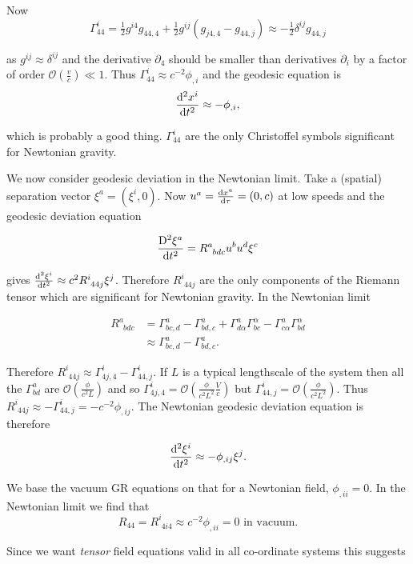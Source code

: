 \documentclass{notes}
\newcommand{\cO}{\mathcal{O}}
\begin{document}
Now
\[
\Gamma^i_{44} = \tfrac{1}{2} g^{i 4} g_{44,4} + \tfrac{1}{2} g^{ij}
(g_{j4,4} - g_{44,j}) \approx - \tfrac{1}{2} \delta^{ij} g_{44,j}
\]

as $g^{ij} \approx \delta^{ij}$ and the derivative $\partial_4$ should be
smaller than derivatives $\partial_i$ by a factor of order
$\cO(\tfrac{v}{c}) \ll 1$.  Thus $\Gamma^i_{44} \approx c^{-2} \phi_{,i}$
and the geodesic equation is
\[
\frac{\mathrm{d}^2 x^i}{\mathrm{d} t^2} \approx - \phi_{,i},
\]

which is probably a good thing.  $\Gamma^i_{44}$ are the only
Christoffel symbols significant for Newtonian gravity.

We now consider geodesic deviation in the Newtonian limit.  Take a
(spatial) separation vector $\xi^a = (\xi^i,0)$.  Now
$u^a = \frac{\mathrm{d} x^a}{\mathrm{d}\tau} = (0,c)$ at low speeds and the geodesic
deviation equation 

\[
\frac{\mathrm{D}^2 \xi^a}{\mathrm{d} t^2} = R^a_{\phantom{a}bdc}
u^b u^d \xi^c
\]

gives $\frac{\mathrm{d}^2 \xi^i}{\mathrm{d} t^2} \approx c^2 R^i_{\phantom{i}44j} \xi^j$.
Therefore $R^i_{\phantom{i}44j}$ are the only components of the Riemann
tensor which are significant for Newtonian gravity.  In the
Newtonian limit

\begin{align*}
R^a_{\phantom{a}bdc} &= \Gamma^a_{bc,d}
- \Gamma^a_{bd,c}
+ \Gamma^a_{d\alpha} \Gamma^\alpha_{bc}
- \Gamma^a_{c\alpha} \Gamma^\alpha_{bd} \\
&\approx \Gamma^a_{bc,d} - \Gamma^a_{bd,c}.
\end{align*}

Therefore $R^i_{\phantom{i}44j} \approx \Gamma^i_{4j,4}
- \Gamma^i_{44,j}$.  If $L$ is a typical lengthscale of the system then
all the $\Gamma^a_{bd}$ are $\cO(\tfrac{\phi}{c^2 L})$ and so
$\Gamma^i_{4j,4} = \cO( \tfrac{\phi}{c^2 L^2}\tfrac{V}{c})$ but
$\Gamma^i_{44,j} = \cO( \tfrac{\phi}{c^2 L^2})$.  Thus
$R^i_{\phantom{i}44j} \approx - \Gamma^i_{44,j} = - c^{-2}
\phi_{,ij}$.  The Newtonian geodesic deviation equation is therefore

\[
\frac{\mathrm{d}^2 \xi^i}{\mathrm{d} t^2} \approx - \phi_{,ij} \xi^j.
\]

We base the vacuum GR equations on that for a Newtonian field,
$\phi_{,ii} = 0$.  In the Newtonian limit we find that
\[
R_{44} = R^i_{\phantom{i}4i4} \approx c^{-2} \phi_{,ii} = 0 \text{ in vacuum.}
\]

Since we want \emph{tensor} field equations valid in all co-ordinate
systems this suggests
\end{document}
